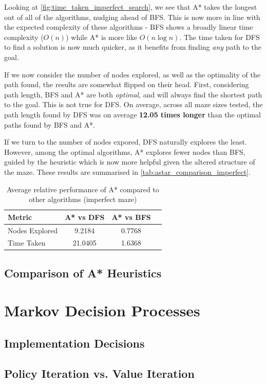 \documentclass{article}
\begin{document}
Looking at \autoref{fig:time_taken_imperfect_search}, we see that A* takes the longest out of all of the algorithms, nudging ahead of BFS. This is now more in line with the expected complexity of these algorithms - BFS shows a broadly linear time complexity ($O(n)$) while A* is more like $O(n \log n)$. The time taken for DFS to find a solution is now much quicker, as it benefits from finding \textit{any} path to the goal.

If we now consider the number of nodes explored, as well as the optimality of the path found, the results are somewhat flipped on their head. First, considering path length, BFS and A* are both \textit{optimal}, and will always find the shortest path to the goal. This is not true for DFS. On average, across all maze sizes tested, the path length found by DFS was on average \textbf{12.05 times longer} than the optimal paths found by BFS and A*.

If we turn to the number of nodes expored, DFS naturally explores the least. However, among the optimal algorithms, A* explores fewer nodes than BFS, guided by the heuristic which is now more helpful given the altered structure of the maze. These results are summarised in \autoref{tab:astar_comparison_imperfect}.


\begin{table}[h]
    \centering
    \begin{tabular}{|l|c|c|c|}
        \hline
        \textbf{Metric} & \textbf{A* vs DFS} & \textbf{A* vs BFS} \\
        \hline
        Nodes Explored & 9.2184 & 0.7768 \\
        \hline
        Time Taken & 21.0405 & 1.6368 \\
        \hline
    \end{tabular}
    \caption{Average relative performance of A* compared to other algorithms (imperfect maze)}
    \label{tab:astar_comparison_imperfect}
\end{table}

\subsection{Comparison of A* Heuristics}

\section{Markov Decision Processes}

\subsection{Implementation Decisions}

\subsection{Policy Iteration vs. Value Iteration}
\end{document}
